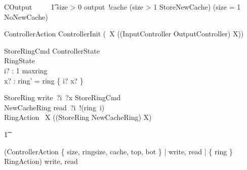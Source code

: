 \begin{circusaction}
    COutput ~~\circdef~~
            \t1 \lcircguard size > 0 \rcircguard \circguard output~!cache \then
            (\lcircguard size > 1 \rcircguard \circguard StoreNewCache)
            \extchoice
            (\lcircguard size = 1 \rcircguard \circguard NoNewCache)
\end{circusaction}




\begin{circusaction}
    ControllerAction \circdef ControllerInit \circseq (\circmu\ X \circspot ((InputController \extchoice OutputController) \circseq X)) \\
\end{circusaction}


\begin{schema}{StoreRingCmd}
    \Xi ControllerState
    \\%
    \Delta RingState
    \\%
    i? : 1 \upto maxring
    \\%
    x? : \nat
\where
    ring' = ring \oplus \{ i? \mapsto x? \}
\end{schema}

\begin{circusaction}
   StoreRing \circdef write~?i~?x \then StoreRingCmd \\
   NewCacheRing \circdef read~?i~!(ring~i) \then \Skip \\
   RingAction \circdef \circmu\ X \circspot ((StoreRing \extchoice NewCacheRing) \circseq X)
\end{circusaction}

\begin{circusaction}
    \t1 \circspot

   (ControllerAction \lpar
        \{ size, ringsize, cache, top, bot \} |
        \lchanset write, read \rchanset |
        \{ ring \} \rpar
    RingAction) \circhide \lchanset write, read \rchanset
\end{circusaction}

\begin{circus}
    \circend
\end{circus}
